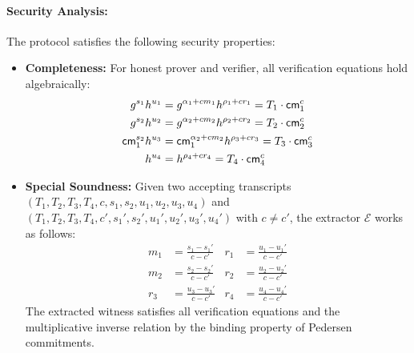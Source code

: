 \paragraph{Security Analysis:}
The protocol satisfies the following security properties:

\begin{itemize}
    \item \textbf{Completeness:} For honest prover and verifier, all verification equations hold algebraically:
    \begin{align*}
        g^{s_1}h^{u_1} &= g^{\alpha_1 + cm_1}h^{\rho_1 + cr_1} = T_1 \cdot \mathsf{cm}_1^c\\
        g^{s_2}h^{u_2} &= g^{\alpha_2 + cm_2}h^{\rho_2 + cr_2} = T_2 \cdot \mathsf{cm}_2^c\\
        \mathsf{cm}_1^{s_2}h^{u_3} &= \mathsf{cm}_1^{\alpha_2 + cm_2}h^{\rho_3 + cr_3} = T_3 \cdot \mathsf{cm}_3^c\\
        h^{u_4} &= h^{\rho_4 + cr_4} = T_4 \cdot \mathsf{cm}_4^c
    \end{align*}
    
    \item \textbf{Special Soundness:} Given two accepting transcripts $(T_1, T_2, T_3, T_4, c, s_1, s_2, u_1, u_2, u_3, u_4)$ and $(T_1, T_2, T_3, T_4, c', s_1', s_2', u_1', u_2', u_3', u_4')$ with $c \neq c'$, the extractor $\mathcal{E}$ works as follows:
    \begin{align*}
        m_1 &= \frac{s_1 - s_1'}{c - c'} &r_1 &= \frac{u_1 - u_1'}{c - c'}\\
        m_2 &= \frac{s_2 - s_2'}{c - c'} &r_2 &= \frac{u_2 - u_2'}{c - c'}\\
        r_3 &= \frac{u_3 - u_3'}{c - c'} &r_4 &= \frac{u_4 - u_4'}{c - c'}
    \end{align*}
    The extracted witness satisfies all verification equations and the multiplicative inverse relation by the binding property of Pedersen commitments.
    

\end{itemize}
